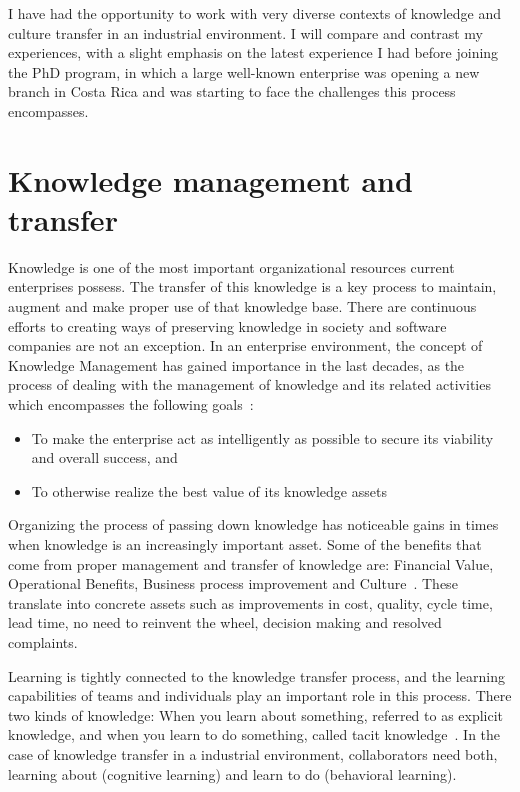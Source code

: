 \documentclass[12pt, letterpaper]{article}
\begin{document}
I have had the opportunity to work with very diverse contexts of knowledge and culture transfer in 
an industrial environment. I will compare and contrast my experiences, with a slight emphasis on the 
latest experience I had before joining the PhD program, in which a large well-known enterprise was 
opening a new branch in Costa Rica and was starting to face the challenges this process encompasses.  


\section{Knowledge management and transfer}
Knowledge is one of the most important organizational resources current enterprises possess.
The transfer of this knowledge is a key process to maintain, augment and
make proper use of that knowledge base. 
There are continuous efforts to creating ways of preserving knowledge in society and software 
companies are not an exception. In an enterprise environment, the concept of Knowledge Management
has gained importance in the last decades, as the process of dealing with the management 
of knowledge and its related activities which encompasses 
the following goals~\cite{wiig97}: 
\begin{itemize}
\item To make the enterprise act as intelligently as possible to secure its viability and overall success, and
\item To otherwise realize the best value of its knowledge assets
\end{itemize}

Organizing the process of passing down knowledge has noticeable gains in times
when knowledge is an increasingly important asset. Some of the benefits that come from proper management and transfer of knowledge are: Financial
Value, Operational Benefits, Business process improvement and Culture~\cite{ibrahim09}. These translate into concrete assets such as
improvements in cost, quality, cycle time, lead time, no need to reinvent the wheel, decision making and resolved complaints.

Learning is tightly connected to the knowledge transfer
process, and the learning capabilities of teams and individuals play an important role in 
this process.
There two kinds of knowledge: When you learn about something, referred to as explicit 
knowledge, and when you learn to do something, called tacit knowledge~\cite{cook99}. 
In the case of knowledge transfer in a industrial environment, collaborators need both, 
learning about (cognitive learning) and learn to do (behavioral learning).
\end{document}
